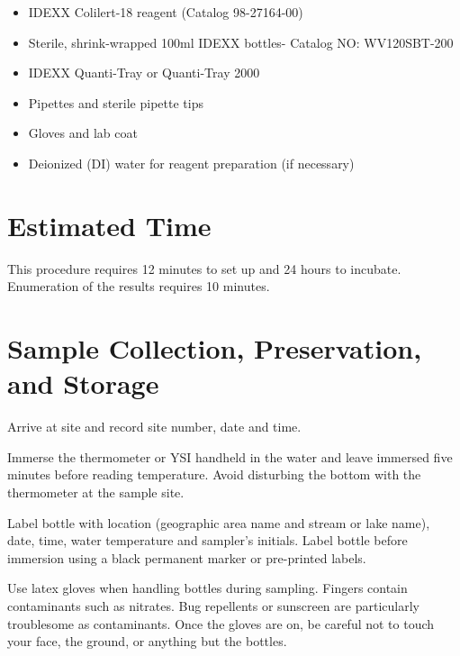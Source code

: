 \documentclass[12pt]{../SOP4_alpha}\usepackage[]{graphicx}\usepackage[]{xcolor}
\begin{document}
\begin{itemize}
\item IDEXX Colilert-18 reagent (Catalog 98-27164-00)
\item Sterile, shrink-wrapped 100ml IDEXX bottles- Catalog NO: WV120SBT-200
\item IDEXX Quanti-Tray or Quanti-Tray 2000
\item Pipettes and sterile pipette tips
\item Gloves and lab coat
\item Deionized (DI) water for reagent preparation (if necessary)
\end{itemize}



\section{Estimated Time}

\NP This procedure requires 12 minutes to set up and 24 hours to incubate. Enumeration of the results requires 10 minutes.

\section{Sample Collection, Preservation, and Storage}

\NP  Arrive at site and record site number, date and time.

\NP Immerse the thermometer or YSI handheld in the water and leave immersed
five minutes before reading temperature. Avoid disturbing the bottom with
the thermometer at the sample site.

\NP Label bottle with location (geographic area name and stream or lake name),
date, time, water temperature and sampler's initials. Label bottle before
immersion using a black permanent marker or pre-printed labels. 

\NP Use latex gloves when handling bottles during sampling. Fingers contain
contaminants such as nitrates. Bug repellents or sunscreen are particularly 
troublesome as contaminants. Once the gloves are on, be careful not to touch
your face, the ground, or anything but the bottles.
\end{document}

